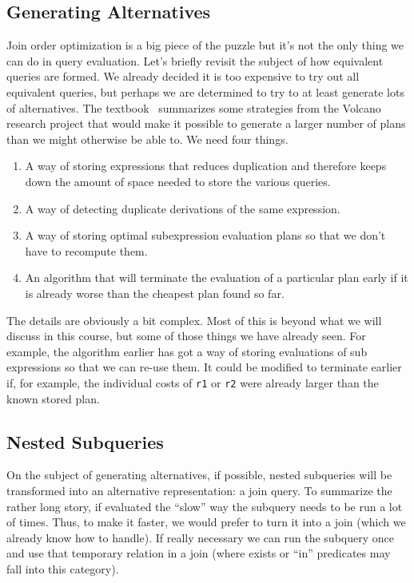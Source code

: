 \documentclass[a4paper]{report}
\begin{document}
\subsection*{Generating Alternatives}

Join order optimization is a big piece of the puzzle but it's not the only thing we can do in query evaluation. Let's briefly revisit the subject of how equivalent queries are formed. We already decided it is too expensive to try out all equivalent queries, but perhaps we are determined to try to at least generate lots of alternatives. The textbook~\cite{dsc} summarizes some strategies from the Volcano research project that would make it possible to generate a larger number of plans than we might otherwise be able to. We need four things.

\begin{enumerate}
	\item A way of storing expressions that reduces duplication and therefore keeps down the amount of space needed to store the various queries.
	\item A way of detecting duplicate derivations of the same expression.
	\item A way of storing optimal subexpression evaluation plans so that we don't have to recompute them.
	\item An algorithm that will terminate the evaluation of a particular plan early if it is already worse than the cheapest plan found so far.
\end{enumerate}

The details are obviously a bit complex. Most of this is beyond what we will discuss in this course, but some of those things we have already seen. For example, the algorithm earlier has got a way of storing evaluations of sub expressions so that we can re-use them. It could be modified to terminate earlier if, for example, the individual costs of \texttt{r1} or \texttt{r2} were already larger than the known stored plan.

\subsection*{Nested Subqueries}

On the subject of generating alternatives, if possible, nested subqueries will be transformed into an alternative representation: a join query. To summarize the rather long story, if evaluated the ``slow'' way the subquery needs to be run a lot of times. Thus, to make it faster, we would prefer to turn it into a join (which we already know how to handle). If really necessary we can run the subquery once and use that temporary relation in a join (where exists or ``in'' predicates may fall into this category).
\end{document}
